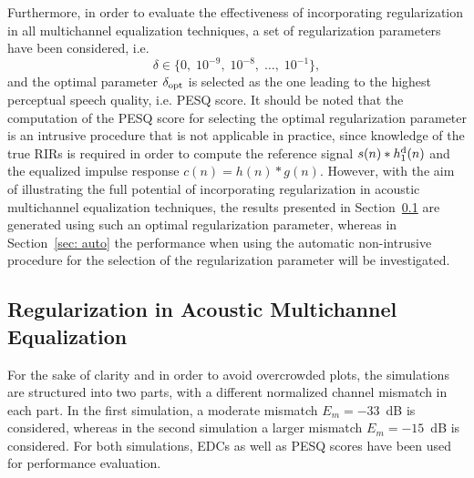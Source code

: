 \documentclass[10pt]{IEEEtran}
\begin{document}
Furthermore, in order to evaluate the effectiveness of incorporating regularization in all multichannel equalization techniques, a set of regularization parameters have been considered, i.e.
\begin{equation}
\delta \in \{0, \; 10^{-9}, \; 10^{-8}, \; \ldots, \; 10^{-1} \},
\end{equation}
and the optimal parameter $\delta_{\rm opt}$ is selected as the one leading to the highest perceptual speech quality, i.e. PESQ score.
It should be noted that the computation of the PESQ score for selecting the optimal regularization parameter is an intrusive procedure that is not applicable in practice, since knowledge of the true RIRs is required in order to compute the reference signal $s(n) \ast h_1^{\rm d}(n)$ and the equalized impulse response $c(n) = h(n) \ast g(n)$.
However, with the aim of illustrating the full potential of incorporating regularization in acoustic multichannel equalization techniques, the results presented in Section~\ref{sec: regacsys} are generated using such an optimal regularization parameter, whereas in Section~\ref{sec: auto} the performance when using the automatic non-intrusive procedure for the selection of the regularization parameter will be investigated.

\subsection{Regularization in Acoustic Multichannel Equalization}
\label{sec: regacsys}
For the sake of clarity and in order to avoid overcrowded plots, the simulations are structured into two parts, with a different normalized channel mismatch in each part.
In the first simulation, a moderate mismatch $E_m = -33$~dB is considered, whereas in the second simulation a larger mismatch $E_m = -15$~dB is considered.
For both simulations, EDCs as well as PESQ scores have been used for performance evaluation.
\end{document}
